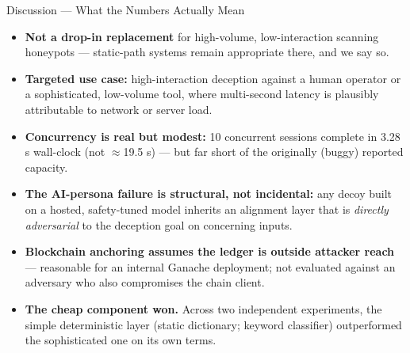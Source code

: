 \documentclass[aspectratio=169,11pt]{beamer}
\newcommand{\srcnote}[1]{\par\vspace{3pt}{\raggedleft\scriptsize\color{grayline}\itshape #1\par}}
\begin{document}
\begin{frame}{Discussion --- What the Numbers Actually Mean}
  \footnotesize
  \begin{itemize}\setlength\itemsep{3.5pt}
    \item \textbf{Not a drop-in replacement} for high-volume, low-interaction scanning honeypots ---
      static-path systems remain appropriate there, and we say so.
    \item \textbf{Targeted use case:} high-interaction deception against a human operator or a
      sophisticated, low-volume tool, where multi-second latency is plausibly attributable to
      network or server load.
    \item \textbf{Concurrency is real but modest:} 10 concurrent sessions complete in 3.28 s
      wall-clock (not $\approx$19.5 s) --- but far short of the originally (buggy) reported capacity.
    \item \textbf{The AI-persona failure is structural, not incidental:} any decoy built on a hosted,
      safety-tuned model inherits an alignment layer that is \emph{directly adversarial} to the
      deception goal on concerning inputs.
    \item \textbf{Blockchain anchoring assumes the ledger is outside attacker reach} --- reasonable for
      an internal Ganache deployment; not evaluated against an adversary who also compromises the
      chain client.
    \item \textbf{The cheap component won.} Across two independent experiments, the simple deterministic
      layer (static dictionary; keyword classifier) outperformed the sophisticated one on its own terms.
  \end{itemize}
  \srcnote{Paper Section VI}
\end{frame}
\end{document}
